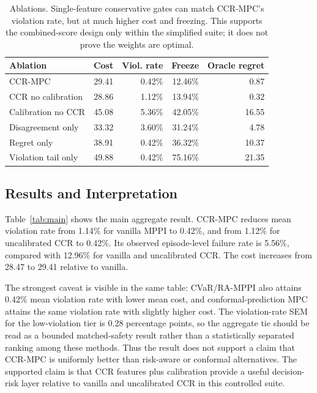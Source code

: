 \documentclass[11pt]{article}
\begin{document}
\begin{table}[t]
\centering
\small
\begin{tabular}{lrrrr}
\toprule
Ablation & Cost & Viol. rate & Freeze & Oracle regret \\
\midrule
CCR-MPC & 29.41 & 0.42\% & 12.46\% & 0.87 \\
CCR no calibration & 28.86 & 1.12\% & 13.94\% & 0.32 \\
Calibration no CCR & 45.08 & 5.36\% & 42.05\% & 16.55 \\
Disagreement only & 33.32 & 3.60\% & 31.24\% & 4.78 \\
Regret only & 38.91 & 0.42\% & 36.32\% & 10.37 \\
Violation tail only & 49.88 & 0.42\% & 75.16\% & 21.35 \\
\bottomrule
\end{tabular}
\caption{Ablations. Single-feature conservative gates can match CCR-MPC's violation rate, but at much higher cost and freezing. This supports the combined-score design only within the simplified suite; it does not prove the weights are optimal.}
\label{tab:ablation}
\end{table}

\subsection{Results and Interpretation}

Table~\ref{tab:main} shows the main aggregate result. CCR-MPC reduces mean violation rate from 1.14\% for vanilla MPPI to 0.42\%, and from 1.12\% for uncalibrated CCR to 0.42\%. Its observed episode-level failure rate is 5.56\%, compared with 12.96\% for vanilla and uncalibrated CCR. The cost increases from 28.47 to 29.41 relative to vanilla.

The strongest caveat is visible in the same table: CVaR/RA-MPPI also attains 0.42\% mean violation rate with lower mean cost, and conformal-prediction MPC attains the same violation rate with slightly higher cost. The violation-rate SEM for the low-violation tier is 0.28 percentage points, so the aggregate tie should be read as a bounded matched-safety result rather than a statistically separated ranking among these methods. Thus the result does not support a claim that CCR-MPC is uniformly better than risk-aware or conformal alternatives. The supported claim is that CCR features plus calibration provide a useful decision-risk layer relative to vanilla and uncalibrated CCR in this controlled suite.
\end{document}
